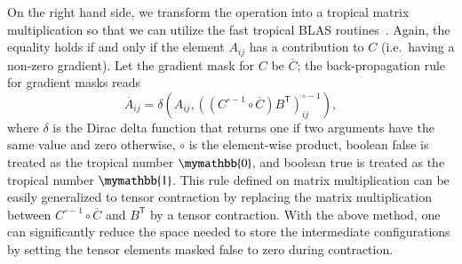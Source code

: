 \documentclass[onefignum, onetabnum]{siamart190516}
\newcommand{\<}{\langle}
\renewcommand{\>}{\rangle}
\begin{document}
On the right hand side, we transform the operation into a tropical matrix multiplication so that we can utilize the fast tropical BLAS routines~\cite{TropicalGEMM}.
Again, the equality holds if and only if the element $A_{ij}$ has a contribution to $C$ (i.e.\ having a non-zero gradient).
Let the gradient mask for $C$ be $\overline C$; the back-propagation rule for gradient masks reads
\begin{equation}\label{eq:adrule}
\overline{A}_{ij} = \delta \left(A_{ij}, \left( \left( C^{\circ-1} \circ \overline C \right) B^{\mathsf{T}} \right)_{ij}^{\circ -1} \right),
\end{equation}
where $\delta$ is the Dirac delta function that returns one if two arguments have the same value and zero otherwise, $\circ$ is the element-wise product, boolean false is treated as the tropical number $\mymathbb{0}$, and boolean true is treated as the tropical number $\mymathbb{1}$.
This rule defined on matrix multiplication can be easily generalized to tensor contraction by replacing the matrix multiplication between $C^{\circ-1} \circ \overline C$ and $B^{\mathsf{T}}$ by a tensor contraction.
With the above method, one can significantly reduce the space needed to store the intermediate configurations by setting the tensor elements masked false to zero during contraction.
\end{document}
